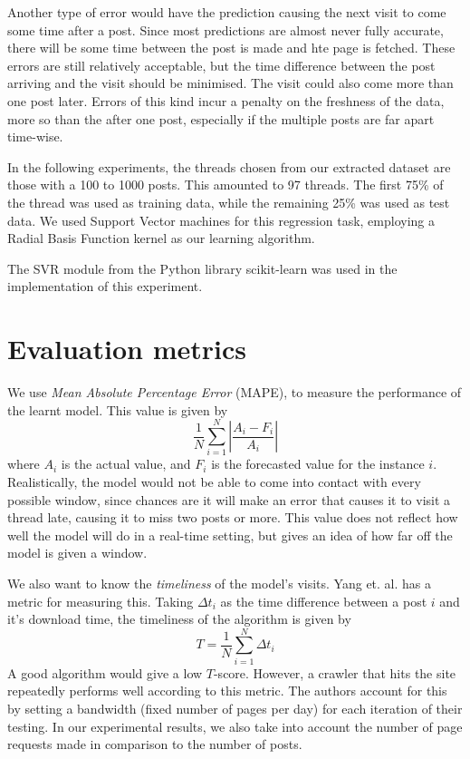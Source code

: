 Another type of error would have the prediction causing the next visit to come some time after a post. Since most predictions are almost never fully accurate, there will be some time between the post is made and hte page is fetched. These errors are still relatively acceptable, but the time difference between the post arriving and the visit should be minimised. The visit could also come more than one post later. Errors of this kind incur a penalty on the freshness of the data, more so than the after one post, especially if the multiple posts are far apart time-wise.


In the following experiments, the threads chosen from our extracted dataset are those with a 100 to 1000 posts. This amounted to 97 threads. The first 75\% of the thread was used as training data, while the remaining 25\% was used as test data. We used Support Vector machines for this regression task, employing a Radial Basis Function kernel as our learning algorithm. 

The SVR module from the Python library scikit-learn was used in the implementation of this experiment.



\section{Evaluation metrics}
We use \emph{Mean Absolute Percentage Error} (MAPE), to measure the performance of the learnt model. This value is given by
\[
	\frac{1}{N}\sum^N_{i=1}\left|\frac{A_i-F_i}{A_i}\right|
\]
where $A_i$ is the actual value, and $F_i$ is the forecasted value for the instance $i$. Realistically, the model would not be able to come into contact with every possible window, since chances are it will make an error that causes %
it to visit a thread late, causing it to miss two posts or more. This value does not reflect how well the model will do in a real-time setting, but gives an idea of how far off the model is given a window. 

We also want to know the \emph{timeliness} of the model's visits. Yang et. al. \cite{Yang2009} has a metric for measuring this. Taking $\Delta t_i$ as the time difference between a post $i$ and it's download time, the timeliness of the algorithm is given by
\[T = \frac{1}{N} \sum^{N}_{i=1}\Delta t_i\]
A good algorithm would give a low $T$-score. However, a crawler that hits the site repeatedly performs well according to this metric. The authors account for this by setting a bandwidth (fixed number of pages per day) for each iteration of their testing. In our experimental results, we also take into account the number of page requests made in comparison to the number of posts. %

